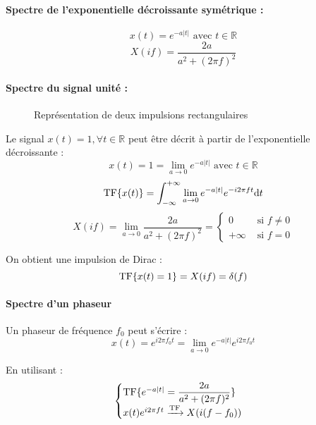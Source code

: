\documentclass[a4paper,12pt]{report}
\begin{document}
\paragraph{Spectre de l'exponentielle décroissante symétrique :}
\[ x(t) = e^{-a|t|} \text{ avec } t \in \mathbb{R} \]
\[ X(if) = \dfrac{2a}{a^2+(2\pi f)^2} \]

\paragraph{Spectre du signal unité :}

\begin{figure}[!htbp]
	\centering
	\caption{Représentation de deux impulsions rectangulaires}
\end{figure}

Le signal $x(t) = 1, \forall t \in \mathbb{R}$ peut être décrit à partir de l'exponentielle décroissante :
\[ x(t) = 1 = \lim_{a \to 0} e^{-a|t|} \text{ avec } t \in \mathbb{R} \]
\[ \mathrm{TF} \{  x(t) \} = \int_{-\infty}^{+\infty} \lim_{a \to 0} e^{-a|t|} e^{-i2\pi ft} \mathrm{d}t \]
\[ X(if) = \lim_{a \to 0} \dfrac{2a}{a^2 + (2\pi f)^2} = \begin{cases}
    0 & \text{ si } f \neq 0 \\
    +\infty & \text{ si } f = 0
\end{cases} \]

On obtient une impulsion de Dirac :
\[ \mathrm{TF} \{  x(t) = 1 \} = X(if) = \delta(f) \]

\paragraph{Spectre d'un phaseur}

Un phaseur de fréquence $f_0$ peut s'écrire :
\[ x(t) = e^{i2\pi f_0t} = \lim_{a \to 0} e^{-a|t|} e^{i2\pi f_0t} \]

En utilisant :
\[ \begin{cases}
    \mathrm{TF} \{  e^{-a|t|} = \dfrac{2a}{a^2 + (2\pi f)^2} \} \\
    x(t)e^{i2\pi ft} \xrightarrow{\mathrm{TF}} X(i(f-f_0))
\end{cases} \]
\end{document}
